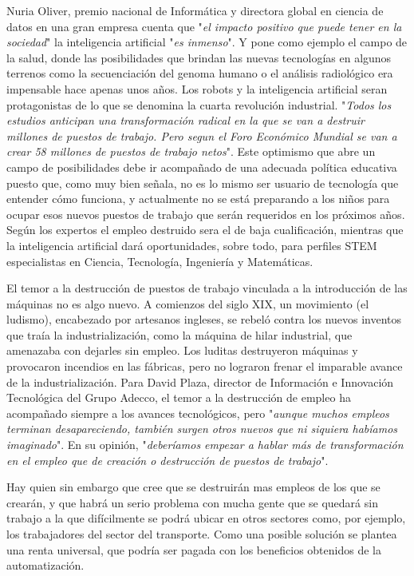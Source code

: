 \documentclass[12pt,a4paper]{article}
\begin{document}
Nuria Oliver, premio nacional de Informática y directora global en ciencia de datos en una gran empresa cuenta que "\emph{el impacto positivo que puede tener en la sociedad}" la inteligencia artificial "\emph{es inmenso}". Y pone como ejemplo el campo de la salud, donde las posibilidades que brindan las nuevas tecnologías en algunos terrenos como la secuenciación del genoma humano o el análisis radiológico era impensable hace apenas unos años. Los robots y la inteligencia artificial seran protagonistas de lo que se denomina la cuarta revolución industrial. "\emph{Todos los estudios anticipan una transformación radical en la que se van a destruir millones de puestos de trabajo. Pero segun el Foro Económico Mundial se van a crear 58 millones de puestos de trabajo netos}". Este optimismo que abre un campo de posibilidades debe ir acompañado de una adecuada política educativa puesto que, como muy bien señala, no es lo mismo ser usuario de tecnología que entender cómo funciona, y actualmente no se está preparando a los niños para ocupar esos nuevos puestos de trabajo que serán requeridos en los próximos años. Según los expertos el empleo destruido sera el de baja cualificación, mientras que la inteligencia artificial dará oportunidades, sobre todo, para perfiles STEM especialistas en Ciencia, Tecnología, Ingeniería y Matemáticas.

El temor a la destrucción de puestos de trabajo vinculada a la introducción de las máquinas no es algo nuevo. A comienzos del siglo XIX, un movimiento (el ludismo), encabezado por artesanos ingleses, se rebeló contra los nuevos inventos que traía la industrialización, como la máquina de hilar industrial, que amenazaba con dejarles sin empleo. Los luditas destruyeron máquinas y provocaron incendios en las fábricas, pero no lograron frenar el imparable avance de la industrialización. Para David Plaza, director de Información e Innovación Tecnológica del Grupo Adecco, el temor a la destrucción de empleo ha acompañado siempre a los avances tecnológicos, pero "\emph{aunque muchos empleos terminan desapareciendo, también surgen otros nuevos que ni siquiera habíamos imaginado}". En su opinión, "\emph{deberíamos empezar a hablar más de transformación en el empleo que de creación o destrucción de puestos de trabajo}".

Hay quien sin embargo que cree que se destruirán mas empleos de los que se crearán, y que habrá un serio problema con mucha gente que se quedará sin trabajo a la que difícilmente se podrá ubicar en otros sectores como, por ejemplo, los trabajadores del sector del transporte. Como una posible solución se plantea una renta universal, que podría ser pagada con los beneficios obtenidos de la automatización.
\end{document}
